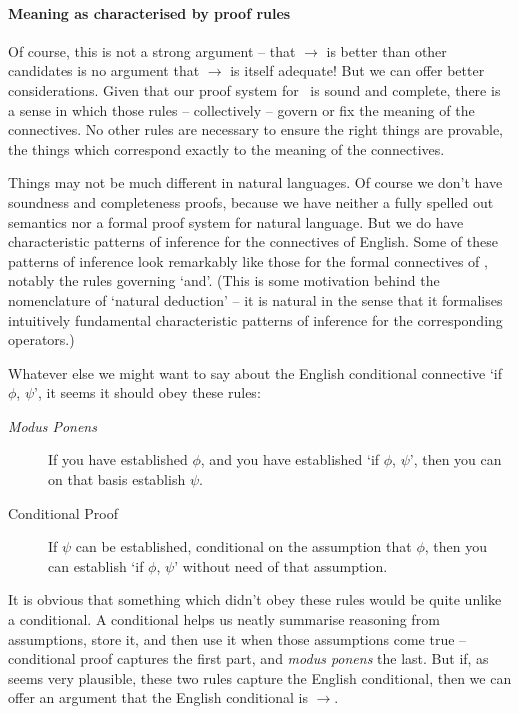 \paragraph{Meaning as characterised by proof rules}
Of course, this is not a strong argument – that $\to$ is better than other candidates is no argument that $\to$ is itself adequate! But we can offer better considerations. Given that our proof system for \lone\ is sound and complete, there is a sense in which those rules – collectively – govern or fix the meaning of the connectives. No other rules are necessary to ensure the right things are provable, the things which correspond exactly to the meaning of the connectives.

Things may not be much different in natural languages. Of course we don't have soundness and completeness proofs, because we have neither a fully spelled out semantics nor a formal proof system for natural language. But we do have characteristic patterns of inference for the connectives of English. Some of these patterns of inference look remarkably like those for the formal connectives of \lone, notably the rules governing `and'. (This is some motivation behind the nomenclature of `natural deduction' – it is natural in the sense that it formalises intuitively fundamental characteristic patterns of inference for the corresponding operators.)

Whatever else we might want to say about the English conditional connective `if $\phi$, $\psi$', it seems it should obey these rules: \begin{description}
	\item [\emph{Modus Ponens}]  If you have established $\phi$, and you have established  `if $\phi$, $\psi$', then you can on that basis establish $\psi$.
	\item [Conditional Proof] If $\psi$ can be established, conditional on the assumption that $\phi$, then you can establish `if $\phi$, $\psi$' without need of that assumption. 
\end{description}
It is obvious that something which didn't obey these rules would be quite unlike a conditional. A conditional helps us neatly summarise reasoning from assumptions, store it, and then use it when those assumptions come true – conditional proof captures the first part, and \emph{modus ponens} the last.
But if, as seems very plausible, these two rules capture the English conditional, then we can offer an argument that the English conditional is $\to$. \\ ~

